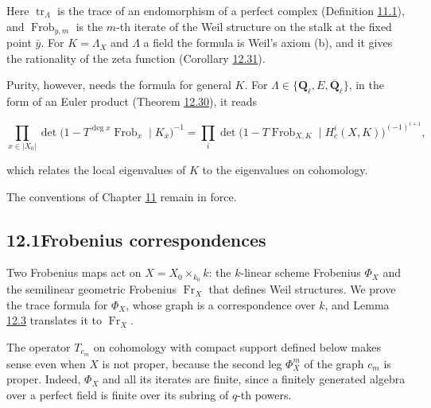 \documentclass[11pt]{article}
\begin{document}
Here \(\operatorname{tr}_\Lambda\) is the trace of an endomorphism of a perfect complex (Definition \hyperref[bp174]{11.1}), and \(\operatorname{Frob}_{y,m}\) is the \(m\)-th iterate of the Weil structure on the stalk at the fixed point \(\bar y\). For \(K=\Lambda_X\) and \(\Lambda\) a field the formula is Weil's axiom (b), and it gives the rationality of the zeta function (Corollary \hyperref[bp320]{12.31}).

Purity, however, needs the formula for general \(K\). For \(\Lambda\in\{\mathbf Q_\ell,E,\overline{\mathbf Q}_\ell\}\), in the form of an Euler product (Theorem \hyperref[bp317]{12.30}), it reads

\[
\prod_{x\in|X_0|}\det\bigl(1-T^{\deg x}\operatorname{Frob}_x\mid K_{\bar x}\bigr)^{-1}
=\prod_i\det\bigl(1-T\operatorname{Frob}_{X,K}\mid H^i_c(X,K)\bigr)^{(-1)^{i+1}},
\]

which relates the local eigenvalues of \(K\) to the eigenvalues on cohomology.

The conventions of Chapter \hyperref[bp170]{11} remain in force.

\subsection*{\texorpdfstring{12.1\quad Frobenius correspondences}{12.1 Frobenius correspondences}}
\label{bp230}%
\label{bp231}%
Two Frobenius maps act on \(X=X_0\times_{k_0}k\): the \(k\)-linear scheme Frobenius \(\Phi_X\) and the semilinear geometric Frobenius \(\operatorname{Fr}_X\) that defines Weil structures. We prove the trace formula for \(\Phi_X\), whose graph is a correspondence over \(k\), and Lemma \hyperref[bp234]{12.3} translates it to \(\operatorname{Fr}_X\).

The operator \(T_{c_m}\) on cohomology with compact support defined below makes sense even when \(X\) is not proper, because the second leg \(\Phi_X^m\) of the graph \(c_m\) is proper. Indeed, \(\Phi_X\) and all its iterates are finite, since a finitely generated algebra over a perfect field is finite over its subring of \(q\)-th powers.
\end{document}
